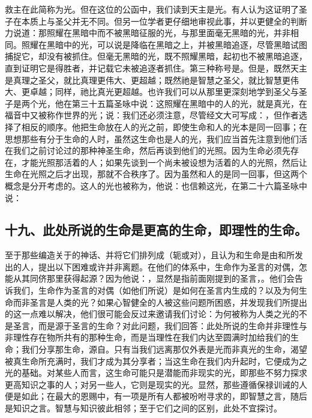 救主在此简称为光。但在这位的公函中，我们读到天主是光。有人认为这证明了圣子在本质上与圣父并无不同。但另一位学者更仔细地审视此事，并以更健全的判断力说道：那照耀在黑暗中而不被黑暗征服的光，与那里面毫无黑暗的光，并非相同。照耀在黑暗中的光，可以说是降临在黑暗之上，并被黑暗追逐，尽管黑暗试图捕捉它，却没有被抓住。但毫无黑暗的光，既不照耀黑暗，起初也不被黑暗追逐，直到证明它是得胜者，并记载它未被追逐者抓住。第三种称号是。但是，既然天主是真理之圣父，就比真理更伟大、更超越；既然祂是智慧之圣父，就比智慧更伟大、更卓越；同样，祂比真光更超越。也许我们可以从那里更深刻地学到圣父与圣子是两个光，他在第三十五篇圣咏中说：这照耀在黑暗中的人的光，就是真光，在福音中又被称作世界的光；说：我们还必须注意，尽管经文大可写成：，但作者选择了相反的顺序。他把生命放在人的光之前，即使生命和人的光本是同一回事；在思想那些有分于生命的人时，虽然这生命也是人的光，我们应当首先注意到他们活在我们之前讨论过的那种神圣生命，然后再谈到他们的光照。因为生命必须先存在，才能光照那活着的人；如果先谈到一个尚未被设想为活着的人的光照，然后让生命在光照之后才出现，那就不合秩序了。因为虽然和人的是同一回事，但这两个概念是分开考虑的。这人的光也被称为，他说：也信赖这光，在第二十六篇圣咏中说：\par


\subsection{十九、此处所说的生命是更高的生命，即理性的生命。}

至于那些编造关于的神话、并将它们排列成（轭或对），且认为和生命是由和所发出的人，提出以下困难或许并非离题。在他们的体系中，生命作为圣言的对偶，怎能从其同侪那里获得起源？因为他说：，显然是指前面刚提到的圣言，。他们会告诉我们，生命作为圣言的对偶（如他们所说）是如何在圣言内生成的？以及为何生命而非圣言是人类的光？如果心智健全的人被这些问题所困惑，并发现我们所提出的这一点难以解决，他们很可能会反过来邀请我们讨论：为何被称为人类之光的不是圣言，而是源于圣言的生命？对此问题，我们回答：此处所说的生命并非理性与非理性存在物所共有的那种生命，而是当理性在我们内达至圆满时加给我们的生命；我们分享那生命，源自。只有当我们远离那仅外表是光而非真光的生命，渴望被真生命所充满时，我们才成为其分享者；当这生命在我们内升起时，它便成为之光的基础。对某些人而言，这生命可能只是潜能而非现实的光，即那些不努力探求更高知识之事的人；对另一些人，它则是现实的光。显然，那些遵循保禄训诫的人便是如此；在最大的恩赐中，有一项是所有人都被吩咐寻求的，即智慧之言，随后是知识之言。智慧与知识彼此相邻；至于它们之间的区别，此处不宜探讨。\par

